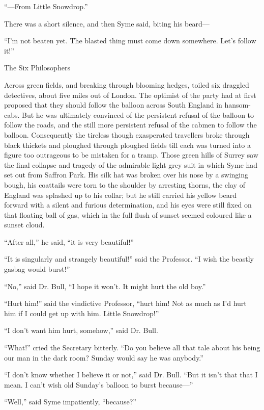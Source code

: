     “⁠—From Little Snowdrop.”

There was a short silence, and then Syme said, biting his beard⁠—

“I’m not beaten yet. The blasted thing must come down somewhere. Let’s follow it!”

\chap The Six Philosophers

Across green fields, and breaking through blooming hedges, toiled six draggled detectives, about five miles out of London. The optimist of the party had at first proposed that they should follow the balloon across South England in hansom-cabs. But he was ultimately convinced of the persistent refusal of the balloon to follow the roads, and the still more persistent refusal of the cabmen to follow the balloon. Consequently the tireless though exasperated travellers broke through black thickets and ploughed through ploughed fields till each was turned into a figure too outrageous to be mistaken for a tramp. Those green hills of Surrey saw the final collapse and tragedy of the admirable light grey suit in which Syme had set out from Saffron Park. His silk hat was broken over his nose by a swinging bough, his coattails were torn to the shoulder by arresting thorns, the clay of England was splashed up to his collar; but he still carried his yellow beard forward with a silent and furious determination, and his eyes were still fixed on that floating ball of gas, which in the full flush of sunset seemed coloured like a sunset cloud.

“After all,” he said, “it is very beautiful!”

“It is singularly and strangely beautiful!” said the Professor. “I wish the beastly gasbag would burst!”

“No,” said Dr. Bull, “I hope it won’t. It might hurt the old boy.”

“Hurt him!” said the vindictive Professor, “hurt him! Not as much as I’d hurt him if I could get up with him. Little Snowdrop!”

“I don’t want him hurt, somehow,” said Dr. Bull.

“What!” cried the Secretary bitterly. “Do you believe all that tale about his being our man in the dark room? Sunday would say he was anybody.”

“I don’t know whether I believe it or not,” said Dr. Bull. “But it isn’t that that I mean. I can’t wish old Sunday’s balloon to burst because⁠—”

“Well,” said Syme impatiently, “because?”

